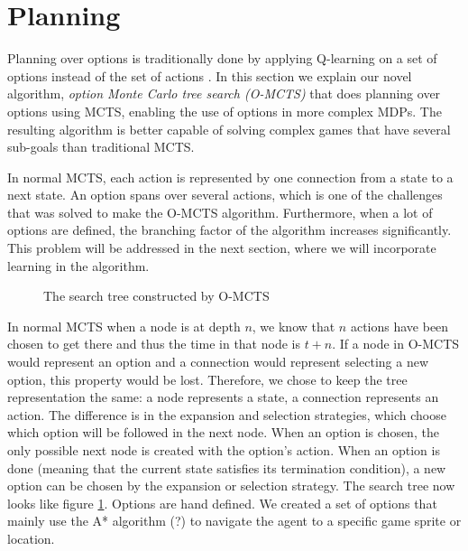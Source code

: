 \section{Planning}
\label{sec:planning}


Planning over options is traditionally done by applying Q-learning on a set of
options instead of the set of actions \cite{sutton1999between}. In this section
we explain our novel algorithm, \emph{option Monte Carlo tree search (O-MCTS)}
that does planning over options using MCTS, enabling the use of options in more
complex MDPs. The resulting algorithm is better capable of solving complex games
that have several sub-goals than traditional MCTS.

In normal MCTS, each action is represented by one connection from a state to a
next state. An option spans over several actions, which is one of the challenges
that was solved to make the O-MCTS algorithm. Furthermore, when a lot
of options are defined, the branching factor of the algorithm increases
significantly. This problem will be addressed in the next section, where we will
incorporate learning in the algorithm.

\begin{figure}
	\centering
	\caption{ The search tree constructed by O-MCTS}
	\label{fig:omcts-tree}
\end{figure}

In normal MCTS when a node is at depth $n$, we know that $n$ actions have been
chosen to get there and thus the time in that node is $t+n$. 
If a node in O-MCTS would represent an option and a connection would represent
selecting a new option, this property would be lost. Therefore, we chose to keep
the tree representation the same: a node represents a state, a connection
represents an action. The difference is in the expansion and selection
strategies, which choose which option will be followed in the next node. When an
option is chosen, the only possible next node is created with the option's
action. When an option is done (meaning that the current state satisfies its
termination condition), a new option can be chosen by the expansion or selection
strategy. The search tree now looks like figure \ref{fig:omcts-tree}.
Options are hand defined. We created a set of options that mainly use the A*
algorithm (\cn?) to navigate the agent to a specific game sprite or location.

